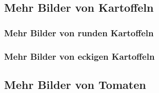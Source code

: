 \subsection*{Mehr Bilder von Kartoffeln}
\blindtext

\subsubsection*{Mehr Bilder von runden Kartoffeln}
\blindtext

\subsubsection*{Mehr Bilder von eckigen Kartoffeln}
\blindtext

\subsection*{Mehr Bilder von Tomaten}
\blindtext